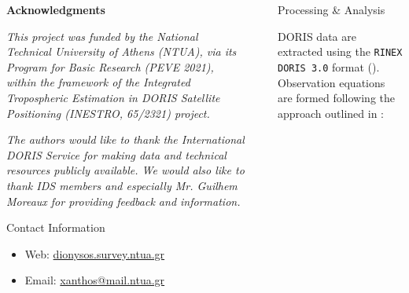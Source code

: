\documentclass[final,a0,portrait]{beamer}
\newlength{\sepwid}
\newlength{\onecolwid}
\begin{document}
\begin{frame}[t]
\begin{columns}[t]
\begin{column}{\onecolwid}
\textbf{Acknowledgments}
\par\textit{\footnotesize This project was funded by the National Technical 
University of Athens (NTUA), via its Program for Basic Research (PEVE 2021), 
within the framework of the \emph{Integrated Tropospheric Estimation in DORIS 
Satellite Positioning} (INESTRO, 65/2321) project.}

\par\textit{\footnotesize The authors would like to thank the International DORIS 
Service for making data and technical resources publicly available. We would also 
like to thank IDS members and especially Mr. Guilhem Moreaux for providing 
feedback and information.}

\begin{alertblock}{Contact Information}
\begin{itemize}
\item Web: \href{http://dionysos.survey.ntua.gr}{dionysos.survey.ntua.gr}
\item Email: \href{xanthos@mail.ntua.gr}{xanthos@mail.ntua.gr}
\end{itemize}
\end{alertblock}




\end{column} %

\begin{column}{\sepwid}\end{column}

\begin{column}{\onecolwid} 


\begin{block}{Processing \& Analysis}

{\small
DORIS data are extracted using the \texttt{RINEX DORIS 3.0} format 
(\cite{DORISRNX3}). Observation equations are formed following the approach 
outlined in \cite{lemoine-2016}:

}
\end{block}
\end{column}
\end{columns}
\end{frame}
\end{document}
